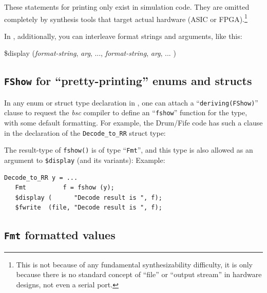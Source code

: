 These {\BSV} statements for printing only exist in simulation code.  They
are omitted completely by synthesis tools that target actual hardware
(ASIC or FPGA).\footnote{This is not because of any fundamental
synthesizability difficulty, it is only because there is no standard
concept of ``file'' or ``output stream'' in hardware designs, not even
a serial port.}

In {\BSV}, additionally, you can interleave format strings and arguments, like this:

\hmmmm
\$display  ({\it format-string}, {\it arg}, ..., {\it format-string}, {\it arg}, ... )


\subsection{{\tt FShow} for ``pretty-printing'' enums and structs}


In any enum or struct type declaration in {\BSV}, one can attach a
``\verb|deriving(FShow)|'' clause to request the \emph{bsc} compiler
to define an ``\verb|fshow|'' function for the type, with some default
formatting.  For example, the Drum/Fife code has such a clause in the
declaration of the \verb|Decode_to_RR| struct type:


The result-type of \verb|fshow()| is of type ``\verb|Fmt|'', and this
type is also allowed as an argument to \verb|$display| (and its
variants):  Example:

{\footnotesize
\begin{Verbatim}[frame=single]
   Decode_to_RR y = ...
   Fmt          f = fshow (y);
   $display (      "Decode result is ", f);
   $fwrite  (file, "Decode result is ", f);
\end{Verbatim}
}


\subsection{{\tt Fmt} formatted values}

